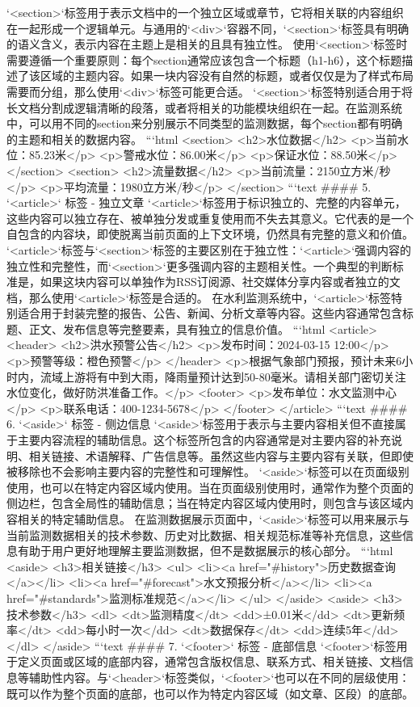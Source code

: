 {{`<section>`标签用于表示文档中的一个独立区域或章节，它将相关联的内容组织在一起形成一个逻辑单元。与通用的`<div>`容器不同，`<section>`标签具有明确的语义含义，表示内容在主题上是相关的且具有独立性。 使用`<section>`标签时需要遵循一个重要原则：每个section通常应该包含一个标题（h1-h6），这个标题描述了该区域的主题内容。如果一块内容没有自然的标题，或者仅仅是为了样式布局需要而分组，那么使用`<div>`标签可能更合适。 `<section>`标签特别适合用于将长文档分割成逻辑清晰的段落，或者将相关的功能模块组织在一起。在监测系统中，可以用不同的section来分别展示不同类型的监测数据，每个section都有明确的主题和相关的数据内容。 ```html <section> <h2>水位数据</h2> <p>当前水位：85.23米</p> <p>警戒水位：86.00米</p> <p>保证水位：88.50米</p> </section> <section> <h2>流量数据</h2> <p>当前流量：2150立方米/秒</p> <p>平均流量：1980立方米/秒</p> </section> ```text #### 5. `<article>` 标签 - 独立文章 `<article>`标签用于标识独立的、完整的内容单元，这些内容可以独立存在、被单独分发或重复使用而不失去其意义。它代表的是一个自包含的内容块，即使脱离当前页面的上下文环境，仍然具有完整的意义和价值。 `<article>`标签与`<section>`标签的主要区别在于独立性：`<article>`强调内容的独立性和完整性，而`<section>`更多强调内容的主题相关性。一个典型的判断标准是，如果这块内容可以单独作为RSS订阅源、社交媒体分享内容或者独立的文档，那么使用`<article>`标签是合适的。 在水利监测系统中，`<article>`标签特别适合用于封装完整的报告、公告、新闻、分析文章等内容。这些内容通常包含标题、正文、发布信息等完整要素，具有独立的信息价值。 ```html <article> <header> <h2>洪水预警公告</h2> <p>发布时间：2024-03-15 12:00</p> <p>预警等级：橙色预警</p> </header> <p>根据气象部门预报，预计未来6小时内，流域上游将有中到大雨，降雨量预计达到50-80毫米。请相关部门密切关注水位变化，做好防洪准备工作。</p> <footer> <p>发布单位：水文监测中心</p> <p>联系电话：400-1234-5678</p> </footer> </article> ```text #### 6. `<aside>` 标签 - 侧边信息 `<aside>`标签用于表示与主要内容相关但不直接属于主要内容流程的辅助信息。这个标签所包含的内容通常是对主要内容的补充说明、相关链接、术语解释、广告信息等。虽然这些内容与主要内容有关联，但即使被移除也不会影响主要内容的完整性和可理解性。 `<aside>`标签可以在页面级别使用，也可以在特定内容区域内使用。当在页面级别使用时，通常作为整个页面的侧边栏，包含全局性的辅助信息；当在特定内容区域内使用时，则包含与该区域内容相关的特定辅助信息。 在监测数据展示页面中，`<aside>`标签可以用来展示与当前监测数据相关的技术参数、历史对比数据、相关规范标准等补充信息，这些信息有助于用户更好地理解主要监测数据，但不是数据展示的核心部分。 ```html <aside> <h3>相关链接</h3> <ul> <li><a href="#history">历史数据查询</a></li> <li><a href="#forecast">水文预报分析</a></li> <li><a href="#standards">监测标准规范</a></li> </ul> </aside> <aside> <h3>技术参数</h3> <dl> <dt>监测精度</dt> <dd>±0.01米</dd> <dt>更新频率</dt> <dd>每小时一次</dd> <dt>数据保存</dt> <dd>连续5年</dd> </dl> </aside> ```text #### 7. `<footer>` 标签 - 底部信息 `<footer>`标签用于定义页面或区域的底部内容，通常包含版权信息、联系方式、相关链接、文档信息等辅助性内容。与`<header>`标签类似，`<footer>`也可以在不同的层级使用：既可以作为整个页面的底部，也可以作为特定内容区域（如文章、区段）的底部。 }}
